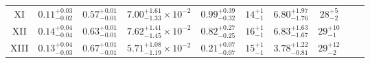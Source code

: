 \begin{table}
\begin{tabular}{|c|c|c|c|c|c|c|c|c|c|}
XI & $0.11_{-0.02}^{+0.03}$ & $0.57_{-0.01}^{+0.01}$ & $7.00_{-1.33}^{+1.61}\times10^{-2}$ & $0.99_{-0.32}^{+0.39}$ & $14_{-1}^{+1}$ & $6.80_{-1.76}^{+1.97}$ & $28_{-2}^{+5}$ & & \\
XII & $0.14_{-0.04}^{+0.04}$ & $0.63_{-0.01}^{+0.01}$ & $7.62_{-1.45}^{+1.41}\times10^{-2}$ & $0.82_{-0.25}^{+0.27}$ & $16_{-1}^{+1}$ & $6.83_{-1.67}^{+1.63}$ & $29_{-1}^{+10}$ & & \\
XIII & $0.13_{-0.03}^{+0.04}$ & $0.67_{-0.01}^{+0.01}$ & $5.71_{-1.19}^{+1.08}\times10^{-2}$ & $0.21_{-0.07}^{+0.07}$ & $15_{-1}^{+1}$ & $3.78_{-0.81}^{+1.22}$ & $29_{-2}^{+12}$ & & \\
\hline
\end{tabular}
\end{table}
